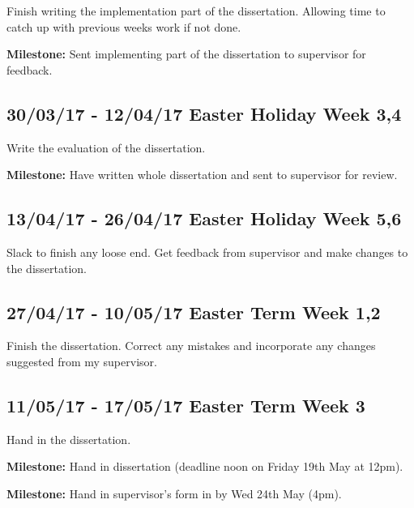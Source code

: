 \documentclass[a4paper]{article}
\begin{document}
      Finish writing the implementation part of the dissertation.
      Allowing time to catch up with previous weeks work if not done.

      \textbf{Milestone:} Sent implementing part of the dissertation to supervisor for feedback.

    \subsection*{30/03/17 - 12/04/17 \hfill Easter Holiday Week 3,4}

      Write the evaluation of the dissertation.

      \textbf{Milestone:} Have written whole dissertation and sent to supervisor for review.


    \subsection*{13/04/17 - 26/04/17 \hfill Easter Holiday Week 5,6}

      Slack to finish any loose end. Get feedback from supervisor and make changes to the dissertation.


    \subsection*{27/04/17 - 10/05/17 \hfill Easter Term Week 1,2}

      Finish the dissertation. Correct any mistakes and incorporate any changes suggested from my supervisor.


    \subsection*{11/05/17 - 17/05/17 \hfill Easter Term Week 3}
      Hand in the dissertation.

     \textbf{Milestone:} Hand in dissertation (deadline noon on Friday 19th May at 12pm).

     \textbf{Milestone:} Hand in supervisor's form in by Wed 24th May (4pm).
\end{document}
